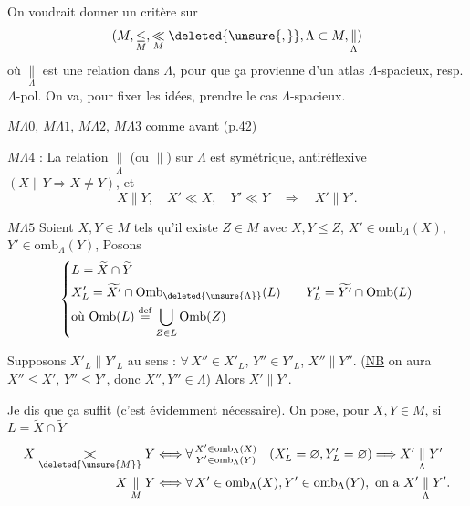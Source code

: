 
On voudrait donner un critère sur
\[
(M,\underset{M}{\leq},\underset{M}{\ll}\deleted{\unsure{,}},\Lambda\subset M,\underset{\Lambda}{\parallel})
\]
où $\underset{\Lambda}{\parallel}$ est une relation dans $\Lambda$,  pour que ça provienne d'un atlas $\Lambda$-spacieux, resp. $\Lambda$-pol. On va, pour fixer les idées, prendre le cas $\Lambda$-spacieux.

\uline{$M\Lambda$}$0$, \uline{$M\Lambda$}$1$, \uline{$M\Lambda2$}, \uline{$M\Lambda3$} comme avant (p.42)

\uline{$M\Lambda4$} : La relation $\underset{\Lambda}{\parallel}$ (ou $\parallel$) sur $\Lambda$ est  symétrique, antiréflexive $(X\parallel Y\Longrightarrow X\ne Y)$, et
\[
X\parallel Y,\quad X'\ll X,\quad Y'\ll Y\quad\Longrightarrow\quad X'\parallel Y'.
\]

\uline{$M\Lambda5$} Soient $X,Y\in M$ tels qu'il existe $Z\in M$ avec $X,Y\leq Z$,  $X'\in\mathrm{omb}_{\Lambda}(X)$, $Y'\in\mathrm{omb}_{\Lambda}(Y)$,
Posons
\[
\left\{\begin{aligned}
&L=\widetilde X\cap\widetilde Y\\
&X'_L=\widetilde{X'}\cap\mathrm{Omb}_{\deleted{\unsure{\Lambda}}}(L)\qquad Y'_L=\widetilde{Y'}\cap\mathrm{Omb}(L)\\
&\text{où }\mathrm{Omb}(L)\overset{\mathrm{def}}{=}\bigcup_{Z\in L}\mathrm{Omb}(Z)
\end{aligned}\right.
\]

Supposons $X'_L\parallel Y'_L$ au sens : $\forall\,X''\in X'_L$, $Y''\in Y'_L$,  $X''\parallel Y''$. (\uline{NB} on aura $X''\leq X'$, $Y''\leq Y'$, donc $X'',Y''\in\Lambda$) Alors $X'\parallel Y'$.

Je dis \uline{que ça suffit} (c'est évidemment nécessaire).  On pose, pour $X,Y\in M$, si $L=\widetilde X\cap\widetilde Y$
\[
\begin{aligned}
X\underset{\deleted{\unsure{M}}}{\mathrel{\rlap{$>$}<}}Y&\Longleftrightarrow
\forall\,\substack{X'\in\mathrm{omb}_{\Lambda}(X)\\Y'\in\mathrm{omb}_{\Lambda}(Y)}
\quad(X'_L=\varnothing,Y'_L=\varnothing)\Longrightarrow X'\underset{\Lambda}{\parallel}Y'\\
X\underset{M}{\parallel}Y&\Longleftrightarrow
\forall\, X'\in\mathrm{omb}_{\Lambda}(X),Y'\in\mathrm{omb}_{\Lambda}(Y),\text{ on a } X'\underset{\Lambda}{\parallel}Y'.
\end{aligned}
\]
